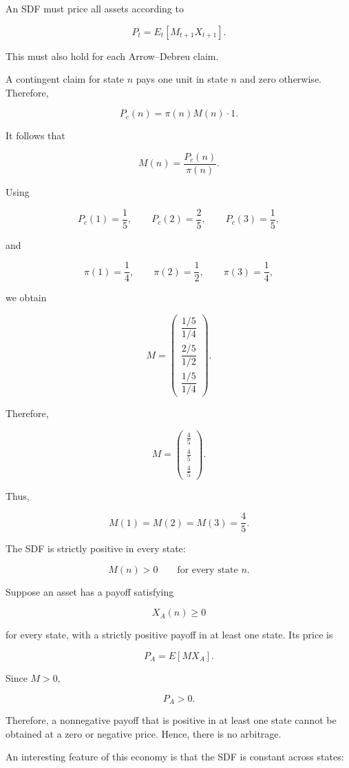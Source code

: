 \documentclass{article}
\begin{document}
An SDF must price all assets according to

\[
P_t
=
E_t[M_{t+1}X_{t+1}].
\]

This must also hold for each Arrow--Debreu claim.

A contingent claim for state \(n\) pays one unit in state \(n\) and zero otherwise. Therefore,

\[
P_c(n)
=
\pi(n)M(n)\cdot 1.
\]

It follows that

\[
M(n)
=
\frac{P_c(n)}{\pi(n)}.
\]

Using

\[
P_c(1)=\frac{1}{5},
\qquad
P_c(2)=\frac{2}{5},
\qquad
P_c(3)=\frac{1}{5},
\]

and

\[
\pi(1)=\frac{1}{4},
\qquad
\pi(2)=\frac{1}{2},
\qquad
\pi(3)=\frac{1}{4},
\]

we obtain

\[
M
=
\begin{pmatrix}
\dfrac{1/5}{1/4}\\[6pt]
\dfrac{2/5}{1/2}\\[6pt]
\dfrac{1/5}{1/4}
\end{pmatrix}.
\]

Therefore,

\[
M
=
\begin{pmatrix}
\frac{4}{5}\\
\frac{4}{5}\\
\frac{4}{5}
\end{pmatrix}.
\]

Thus,

\[
\boxed{
M(1)=M(2)=M(3)=\frac{4}{5}.
}
\]

The SDF is strictly positive in every state:

\[
M(n)>0
\qquad
\text{for every state }n.
\]

Suppose an asset has a payoff satisfying

\[
X_A(n)\geq 0
\]

for every state, with a strictly positive payoff in at least one state. Its price is

\[
P_A
=
E[M X_A].
\]

Since \(M>0\),

\[
P_A>0.
\]

Therefore, a nonnegative payoff that is positive in at least one state cannot be obtained at a zero or negative price. Hence, there is no arbitrage.

An interesting feature of this economy is that the SDF is constant across states:
\end{document}
